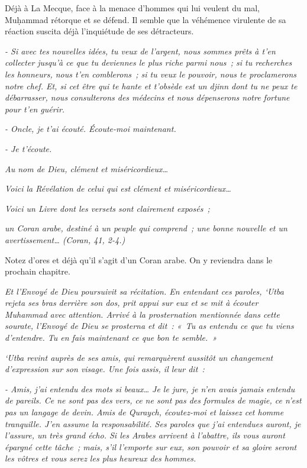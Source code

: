 Déjà à La Mecque, face à la menace d'hommes qui lui veulent du mal,
Muḥammad rétorque et se défend. Il semble que la véhémence virulente de
sa réaction suscita déjà l'inquiétude de ses détracteurs.


\emph{- Si avec tes nouvelles idées, tu veux de l'argent, nous sommes
prêts à t'en collecter jusqu'à ce que tu deviennes le plus riche parmi
nous~; si tu recherches les honneurs, nous t'en comblerons~; si tu veux
le pouvoir, nous te proclamerons notre chef. Et, si cet être qui te
hante et t'obsède est un djinn dont tu ne peux te débarrasser, nous
consulterons des médecins et nous dépenserons notre fortune pour t'en
guérir.}

\emph{- Oncle, je t'ai écouté. Écoute-moi maintenant.}

\emph{- Je t'écoute.}

\emph{Au nom de Dieu, clément et miséricordieux\ldots{}}

\emph{Voici la Révélation de celui qui est clément et
miséricordieux\ldots{}}

\emph{Voici un Livre dont les versets sont clairement exposés~;}

\emph{un Coran arabe, destiné à un peuple qui comprend~; une bonne
nouvelle et un avertissement\ldots{} (Coran, 41, 2-4.)}

Notez d'ores et déjà qu'il s'agit d'un Coran arabe. On y reviendra dans
le prochain chapitre.

\emph{Et l'Envoyé de Dieu poursuivit sa récitation. En entendant ces
paroles, `Utba rejeta ses bras derrière son dos, prit appui sur eux et
se mit à écouter Muhammad avec attention. Arrivé à la prosternation
mentionnée dans cette sourate, l'Envoyé de Dieu se prosterna et dit~:
«~Tu as entendu ce que tu viens d'entendre. Tu en fais maintenant ce que
bon te semble.~»}

\emph{`Utba revint auprès de ses amis, qui remarquèrent aussitôt un
changement d'expression sur son visage. Une fois assis, il leur dit~:}

\emph{- Amis, j'ai entendu des mots si beaux\ldots{} Je le jure, je n'en
avais jamais entendu de pareils. Ce ne sont pas des vers, ce ne sont pas
des formules de magie, ce n'est pas un langage de devin. Amis de
Quraych, écoutez-moi et laissez cet homme tranquille. J'en assume la
responsabilité. Ses paroles que j'ai entendues auront, je l'assure, un
très grand écho. Si les Arabes arrivent à l'abattre, ils vous auront
épargné cette tâche~; mais, s'il l'emporte sur eux, son pouvoir et sa
gloire seront les vôtres et vous serez les plus heureux des hommes.}

